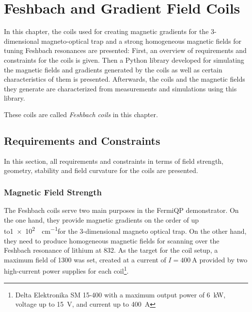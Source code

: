 \renewcommand{\imagepath}{../40-coils/img}

\chapter{Feshbach and Gradient Field Coils}\label{ch:coils}


In this chapter, the coils used for creating magnetic gradients for the 3-dimensional magneto-optical trap and a strong homogeneous magnetic fields for tuning Feshbach resonances are presented: First, an overview of requirements and constraints for the coils is given. Then a Python library developed for simulating the magnetic fields and gradients generated by the coils as well as certain characteristics of them is presented. Afterwards, the coils and the magnetic fields they generate are characterized from measurements and simulations using this library.

These coils are called \textit{Feshbach coils} in this chapter.

\section{Requirements and Constraints}
In this section, all requirements and constraints in terms of field strength, geometry, stability and field curvature for the coils are presented.

\subsection*{Magnetic Field Strength}
The Feshbach coils serve two main purposes in the FermiQP demonstrator. On the one hand, they provide magnetic gradients on the order of up to\SI[]{1e2}{\gauss\per\centi\meter}for the 3-dimensional magneto optical trap. On the other hand, they need to produce homogeneous magnetic fields for scanning over the Feshbach resonance of lithium at \SI{832}{\gauss}. As the target for the coil setup, a maximum field of \SI{1300}{\gauss} was set, created at a current of $I = \SI{400}{\ampere}$ provided by two high-current power supplies for each coil\footnote{Delta Elektronika SM 15-400 with a maximum output power of \SI[]{6}{\kilo\watt}, voltage up to \SI[]{15}{\volt}, and current up to \SI[]{400}{\ampere}}.

